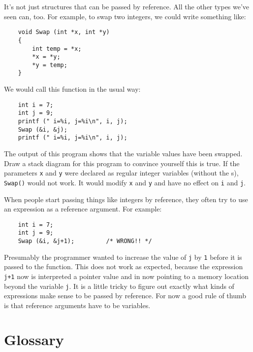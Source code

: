 It's not just structures that can be passed by reference.
All the other types we've seen can, too.  For example, to swap
two integers, we could write something like:

\begin{verbatim}
	void Swap (int *x, int *y)
	{
		int temp = *x;
		*x = *y;
		*y = temp;
	}
\end{verbatim}
%
We would call this function in the usual way:

\begin{verbatim}
	int i = 7;
	int j = 9;
	printf (" i=%i, j=%i\n", i, j);
	Swap (&i, &j);
	printf (" i=%i, j=%i\n", i, j);
\end{verbatim}
%
The output of this program shows that the variable
values have been swapped.  Draw a stack
diagram for this program to convince yourself this is true.
If the parameters {\tt x} and {\tt y} were declared as
regular integer variables (without the {\tt \*}s), {\tt Swap()} would
not work.  It would modify {\tt x} and {\tt y} and have no
effect on {\tt i} and {\tt j}.

When people start passing things like integers by reference,
they often try to use an expression
as a reference argument.  For example:

\begin{verbatim}
	int i = 7;
	int j = 9;
	Swap (&i, &j+1);         /* WRONG!! */
\end{verbatim}
%
Presumably the programmer wanted to increase the value of {\tt j} by {\tt 1}
before it is passed to the function.
This does not work as expected, because the expression {\tt j+1} now
is interpreted a pointer value and in now pointing to a memory
location beyond the variable {\tt j}. 
It is a little tricky to figure out exactly
what kinds of expressions make sense to be passed by reference.  For now
a good rule of thumb is that reference arguments have to be
variables.


\section{Glossary}

